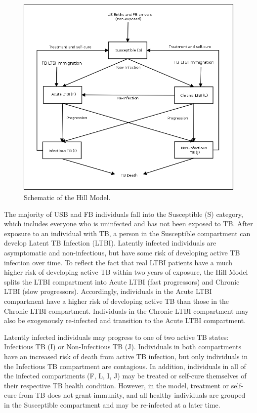 \documentclass{amsart}
\begin{document}
\begin{figure}[h]
  \begin{center}
    \includegraphics[scale=0.25]{figures/HillModelFlowChart.png}
  \end{center}
  \caption{Schematic of the Hill Model.}
  \label{fig:hillModelSchematic}
\end{figure}

The majority of USB and FB individuals fall into the Susceptible (S) category,
which includes everyone who is uninfected and has not been exposed to TB.  After
exposure to an individual with TB, a person in the Susceptible compartment can
develop Latent TB Infection (LTBI). Latently infected individuals are
asymptomatic and non-infectious, but have some risk of developing active TB
infection over time. To reflect the fact that real LTBI patients have a
much higher risk of developing active TB within two years of exposure, the Hill
Model splits the LTBI compartment into Acute LTBI (fast progressors) and Chronic
LTBI (slow progressors). Accordingly, individuals in the Acute LTBI compartment
have a higher risk of developing active TB than those in the Chronic LTBI
compartment. Individuals in the Chronic LTBI compartment may also be
exogenously re-infected and transition to the Acute LTBI compartment. 

Latently infected individuals may progress to one of two active TB states: Infectious TB (I) or 
Non-Infectious TB (J).  Individuals in both compartments have an increased risk of death from
active TB infection, but only individuals in the Infectious TB compartment are contagious.  
In addition, individuals in all of the infected compartments (F, L, I, J) may be treated or self-cure
themselves of their respective TB health condition.  However, in the model, treatment or self-cure from TB
does not grant immunity, and all healthy individuals are grouped in the Susceptible compartment
and may be re-infected at a later time.
\end{document}
